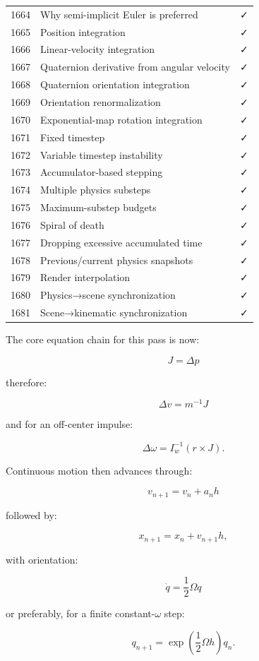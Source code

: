 {\begin{longtable}[]{@{}rll@{}}
1664 & Why semi-implicit Euler is preferred & ✓ \\
1665 & Position integration & ✓ \\
1666 & Linear-velocity integration & ✓ \\
1667 & Quaternion derivative from angular velocity & ✓ \\
1668 & Quaternion orientation integration & ✓ \\
1669 & Orientation renormalization & ✓ \\
1670 & Exponential-map rotation integration & ✓ \\
1671 & Fixed timestep & ✓ \\
1672 & Variable timestep instability & ✓ \\
1673 & Accumulator-based stepping & ✓ \\
1674 & Multiple physics substeps & ✓ \\
1675 & Maximum-substep budgets & ✓ \\
1676 & Spiral of death & ✓ \\
1677 & Dropping excessive accumulated time & ✓ \\
1678 & Previous/current physics snapshots & ✓ \\
1679 & Render interpolation & ✓ \\
1680 & Physics→scene synchronization & ✓ \\
1681 & Scene→kinematic synchronization & ✓ \\
\end{longtable}
}

The core equation chain for this pass is now:

\[
\boxed{
J
=
\Delta p
}
\]

therefore:

\[
\boxed{
\Delta v
=
m^{-1}J
}
\]

and for an off-center impulse:

\[
\boxed{
\Delta\omega
=
I_w^{-1}
(r\times J).
}
\]

Continuous motion then advances through:

\[
\boxed{
v_{n+1}
=
v_n+a_nh
}
\]

followed by:

\[
\boxed{
x_{n+1}
=
x_n+v_{n+1}h,
}
\]

with orientation:

\[
\boxed{
\dot q
=
\frac12\Omega q
}
\]

or preferably, for a finite constant-\(\omega\) step:

\[
\boxed{
q_{n+1}
=
\exp\left(
\frac12\Omega h
\right)q_n.
}
\]


